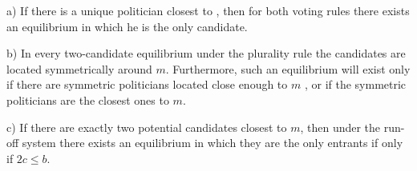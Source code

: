\begin{proposition}
	a) If there is a unique politician closest to , then for both voting
	rules there exists an equilibrium in which he is the only candidate.
	
	b) In every two-candidate equilibrium under the plurality rule the
	candidates are located symmetrically around $m$. Furthermore, such an equilibrium will exist only if there are symmetric politicians located close enough to $m$ , or if the symmetric
	politicians are the closest ones to $m$.
	
	c) If there are exactly two potential candidates closest to $m$, then under
	the run-off system there exists an equilibrium in which they are the only
	entrants if only if $2c\leq b$.
	
\end{proposition}
